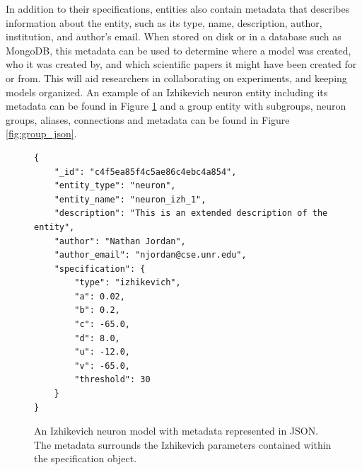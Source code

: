 In addition to their specifications, entities also contain metadata that describes information about the entity, such as its type, name, description, author, institution, and author's email. When stored on disk or in a database such as MongoDB, this metadata can be used to determine where a model was created, who it was created by, and which scientific papers it might have been created for or from. This will aid researchers in collaborating on experiments, and keeping models organized. An example of an Izhikevich neuron entity including its metadata can be found in Figure \ref{fig:izh_json} and a group entity with subgroups, neuron groups, aliases, connections and metadata can be found in Figure \ref{fig:group_json}.

\begin{figure}
\begin{center}
\begin{lstlisting}
{
    "_id": "c4f5ea85f4c5ae86c4ebc4a854",
    "entity_type": "neuron",
    "entity_name": "neuron_izh_1",
    "description": "This is an extended description of the entity",
    "author": "Nathan Jordan",
    "author_email": "njordan@cse.unr.edu",
    "specification": {
        "type": "izhikevich",
        "a": 0.02,
        "b": 0.2,
        "c": -65.0,
        "d": 8.0,
        "u": -12.0,
        "v": -65.0,
        "threshold": 30
    }
}
\end{lstlisting}
\caption[JSON Izhikevich neuron model]{An Izhikevich neuron model with metadata represented in JSON. The metadata surrounds the Izhikevich parameters contained within the specification object.\label{fig:izh_json}}
\end{center}
\end{figure}

\lstset{
  basicstyle=\tiny\ttfamily
}

